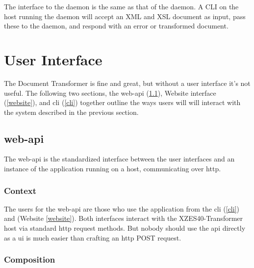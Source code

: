 The interface to the daemon is the same as that of the daemon.
A CLI on the host running the daemon will accept an XML and XSL document as input, pass these to the daemon, and respond with an error or transformed document.

\section{User Interface}
\label{user-interface}

The Document Transformer is fine and great, but without a user interface it's not useful.
The following two sections, the \gls{web-api} (\ref{web-api}), Website interface (\ref{website}), and \gls{cli} (\ref{cli}) together outline the ways users will will interact with the system described in the previous section.

\subsection{\gls{web-api}}
\label{web-api}

The \gls{web-api} is the standardized interface between the user interfaces and an instance of the application running on a host, communicating over \gls{http}.

\subsubsection{Context}

The users for the \gls{web-api} are those who use the application from the \gls{cli} (\ref{cli}) and (Website \ref{website}).
Both interfaces interact with the XZES40-Transformer host via standard \gls{http} request methods.
But nobody should use the \gls{api} directly as a \gls{ui} is much easier than crafting an \gls{http} POST request.

\subsubsection{Composition}

